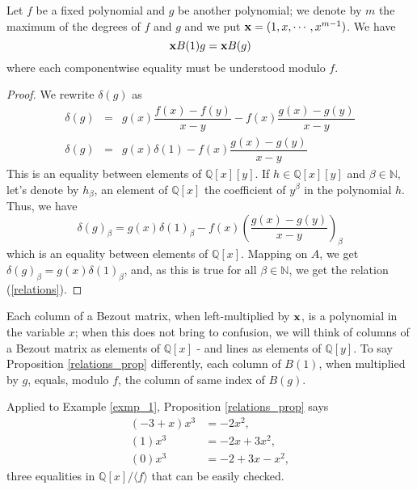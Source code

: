 \documentclass{standalone}
\begin{document}
\begin{rem}
\begin{prop}
\label{relations_prop}
Let $f$ be a fixed polynomial and $g$ be another polynomial; we denote by $m$ the maximum of the degrees of $f$ and $g$ and we put $\bold{x} = (1, x,\cdots, x^{m-1})$. We have
\begin{equation}
\label{relations}
	\bold{x}B(1)g = \bold{x}B(g)
\end{equation}
where each componentwise equality must be understood modulo $f$.
\end{prop}
\begin{proof}
We rewrite $\delta(g)$ as
\begin{align*} \nonumber
	\delta(g) & = & g(x)\dfrac{f(x)-f(y)}{x-y} - f(x)\dfrac{g(x)-g(y)}{x-y} \\ \nonumber
	\delta(g) & = & g(x)\delta(1) - f(x)\dfrac{g(x)-g(y)}{x-y}
\end{align*}
This is an equality between elements of $\mathbb{Q}[x][y]$. If $h\in \mathbb{Q}[x][y]$ and $\beta\in\mathbb{N}$, let's denote by $h_\beta$, an element of $\mathbb{Q}[x]$ the coefficient of $y^\beta$ in the polynomial $h$. Thus, we have
$$\delta(g)_\beta = g(x)\delta(1)_\beta - f(x)\left(\dfrac{g(x)-g(y)}{x-y}\right)_\beta$$
which is an equality between elements of $\mathbb{Q}[x]$. Mapping on $A$, we get
$\delta(g)_\beta = g(x)\delta(1)_\beta$,
and, as this is true for all $\beta\in\mathbb{N}$, we get the relation (\ref{relations}).
\end{proof}

\begin{rem}

Each column of a Bezout matrix, when left-multiplied by $\bold{x}$, is a polynomial in the variable $x$; when this does not bring to confusion, we will think of columns of a Bezout matrix as elements of $\mathbb{Q}[x]$ - and lines as elements of $\mathbb{Q}[y]$.
To say Proposition \ref{relations_prop} differently, each column of $B(1)$, when multiplied by $g$, equals, modulo $f$, the column of same index of $B(g)$.
\end{rem}

\begin{exmp}
Applied to Example \ref{exmp_1}, Proposition \ref{relations_prop} says
\begin{align*} \nonumber
 (-3 + x)x^3 &= -2x^2, \\
 (1)x^3 &= -2x + 3x^2, \\
 (0)x^3 &= -2 + 3x - x^2,
\end{align*}
three equalities in $\mathbb{Q}[x]/\langle f \rangle$ that can be easily checked.
\end{exmp}


\end{rem}
\end{document}
